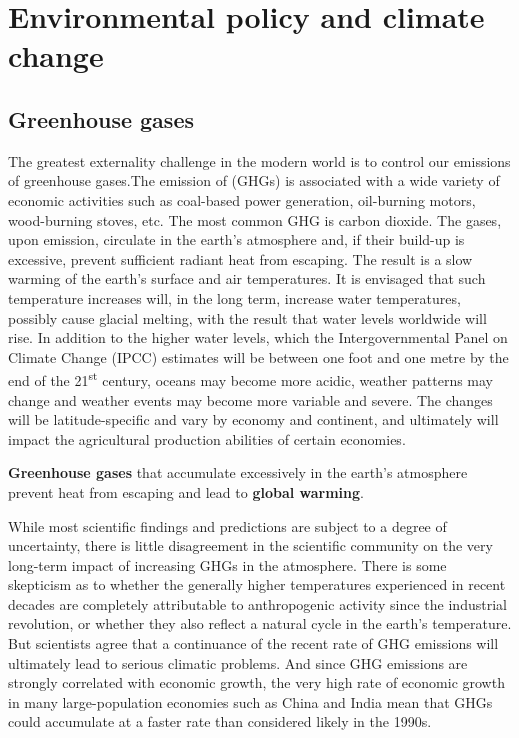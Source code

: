 \section{Environmental policy and climate change}\label{sec:ch5sec7}

\subsection*{Greenhouse gases}

The greatest externality challenge in the modern world is to control our
emissions of greenhouse gases.The emission of 
(GHGs) is associated with a wide variety of economic activities such as
coal-based power generation, oil-burning motors, wood-burning stoves, etc.
The most common GHG is carbon dioxide. The gases, upon emission, circulate
in the earth's atmosphere and, if their build-up is excessive, prevent
sufficient radiant heat from escaping. The result is a slow warming of the
earth's surface and air temperatures. It is envisaged that such temperature
increases will, in the long term, increase water temperatures, possibly
cause glacial melting, with the result that water levels worldwide will
rise. In addition to the higher water levels, which the Intergovernmental
Panel on Climate Change (IPCC) estimates will
be between one foot and one metre by the end of the 21\textsuperscript{st}
century, oceans may become more acidic, weather patterns may change and
weather events may become more variable and severe. The changes will be
latitude-specific and vary by economy and continent, and ultimately will
impact the agricultural production abilities of certain economies.

\begin{DefBox}
\textbf{Greenhouse gases} that accumulate excessively in the earth's atmosphere prevent heat from escaping and lead to \textbf{global warming}.
\end{DefBox}

While most scientific findings and predictions are subject to a degree of
uncertainty, there is little disagreement in the scientific community on the
very long-term impact of increasing GHGs in the atmosphere. There is some
skepticism as to whether the generally higher temperatures experienced in
recent decades are completely attributable to anthropogenic activity since
the industrial revolution, or whether they also reflect a natural cycle in
the earth's temperature. But scientists agree that a continuance of the
recent rate of GHG emissions will ultimately lead to serious climatic
problems. And since GHG emissions are strongly correlated with economic
growth, the very high rate of economic growth in many large-population
economies such as China and India mean that GHGs could accumulate at a
faster rate than considered likely in the 1990s.


